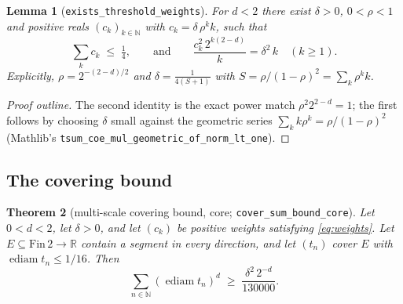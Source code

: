 \documentclass[11pt,a4paper]{article}
\newcommand{\R}{\mathbb{R}}
\newcommand{\N}{\mathbb{N}}
\DeclareMathOperator{\ediam}{ediam}
\newcommand{\FinTwo}{\ensuremath{\mathrm{Fin}\,2 \to \R}}
\newcommand{\lname}[1]{\texttt{#1}}                  %
\newcommand{\lb}{\_\allowbreak}                      %
\newtheorem{theorem}{Theorem}[section]
\newtheorem{lemma}[theorem]{Lemma}
\theoremstyle{definition}
\theoremstyle{remark}
\begin{document}
\begin{lemma}[{\lname{exists\_threshold\_weights}}]
\label{lem:weights}
For $d<2$ there exist $\delta>0$, $0<\rho<1$ and positive reals $(c_k)_{k\in\N}$ with
$c_k=\delta\,\rho^k k$, such that
\begin{equation}\label{eq:weights}
  \sum_{k} c_k \;\le\; \tfrac14,
  \qquad\text{and}\qquad
  \frac{c_k^{2}\, 2^{k(2-d)}}{k} = \delta^{2}\, k\quad (k\ge1).
\end{equation}
Explicitly, $\rho = 2^{-(2-d)/2}$ and $\delta = \tfrac{1}{4(S+1)}$ with
$S=\rho/(1-\rho)^2=\sum_k \rho^k k$.
\end{lemma}

\begin{proof}[Proof outline]
The second identity is the exact power match $\rho^2 2^{2-d}=1$; the first follows by
choosing $\delta$ small against the geometric series $\sum_k k\rho^k = \rho/(1-\rho)^2$
(Mathlib's \lname{tsum\lb coe\lb mul\lb geometric\lb of\lb norm\lb lt\lb one}).
\end{proof}

\subsection{The covering bound}

\begin{theorem}[{multi-scale covering bound, core; \lname{cover\_sum\_bound\_core}}]
\label{thm:cover-core}
Let $0<d<2$, let $\delta>0$, and let $(c_k)$ be positive weights satisfying
\eqref{eq:weights}.  Let $E\subseteq\FinTwo$ contain a segment in every direction, and let
$(t_n)$ cover $E$ with $\ediam t_n\le 1/16$.  Then
\[
  \sum_{n\in\N} (\ediam t_n)^{d}\;\ge\; \frac{\delta^{2}\,2^{-d}}{130000}.
\]
\end{theorem}
\end{document}
